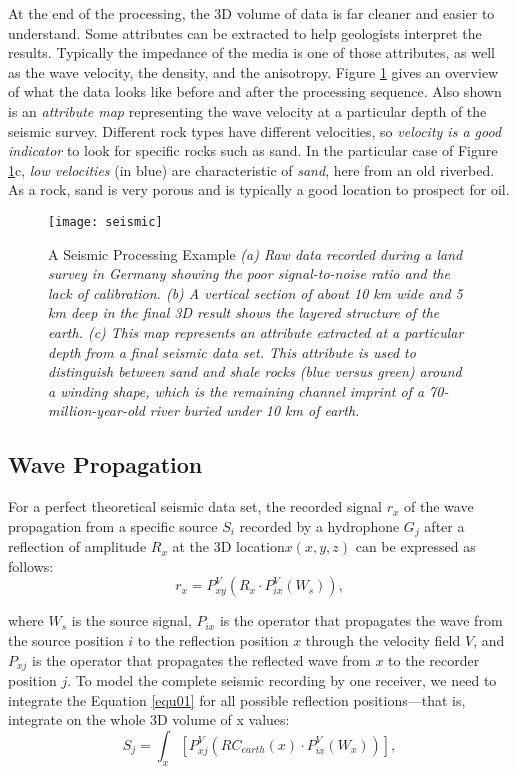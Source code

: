 \documentclass[twocolumn]{article}
\begin{document}
At the end of the processing, the 3D volume of data is far cleaner and easier to understand. Some attributes can be extracted to help geologists interpret the results. Typically the impedance of the media is one of those attributes, as well as the wave velocity, the density, and the anisotropy. Figure \ref{seismic} gives an overview of what the data looks like before and after the processing sequence. Also shown is an \textit{attribute map} representing the wave velocity at a particular depth of the seismic survey. Different rock types have different velocities, so \textit{velocity is a good indicator} to look for specific rocks such as sand. In the particular case of Figure \ref{seismic}c, \textit{low velocities }(in blue) are characteristic of \textit{sand}, here from an old riverbed. As a rock, sand is very porous and is typically a good location to prospect for oil.

\begin{figure}[htb]
        \centering
        \texttt{[image: seismic]}
        \caption{A Seismic Processing Example \small{\emph{ (a) Raw data recorded during a land survey in Germany showing the poor signal-to-noise ratio and the lack of calibration. (b) A vertical section of about 10 km wide and 5 km deep in the final 3D result shows the layered structure of the earth. (c) This map represents an attribute extracted at a particular depth from a final seismic data set. This attribute is used to distinguish between sand and shale rocks (blue versus green) around a winding shape, which is the remaining channel imprint of a 70-million-year-old river buried under 10 km of earth.
	}}
	}
        \label{seismic}
\end{figure}

\subsection{Wave Propagation}
For a perfect theoretical seismic data set, the recorded signal $r_x$ of the wave propagation from a specific source $S_i$ recorded by a hydrophone $G_j$ after a reflection of amplitude $R_x$ at the 3D location$ x(x, y, z)$ can be expressed as follows:
\begin{equation}
r_x = P^V_{xy}(R_x \cdot P^V_{ix}(W_s)),
\label{equ01}
\end{equation}

where $W_s$ is the source signal, $P_{ix}$ is the operator that propagates the wave from the source position $i$ to the reflection position $x$ through the velocity field $V$, and $P_{xj}$ is the operator that propagates the reflected wave from $x$ to the recorder position $j$.
To model the complete seismic recording by one receiver, we need to integrate the Equation \ref{equ01} for all possible reflection positions—that is, integrate on the whole 3D volume of x values:
\begin{equation}
S_j = \int_x [P^V_{xj}(RC_{earth}(x) \cdot P^V_{ix}(W_x))],
\label{equ02}
\end{equation}
\end{document}
